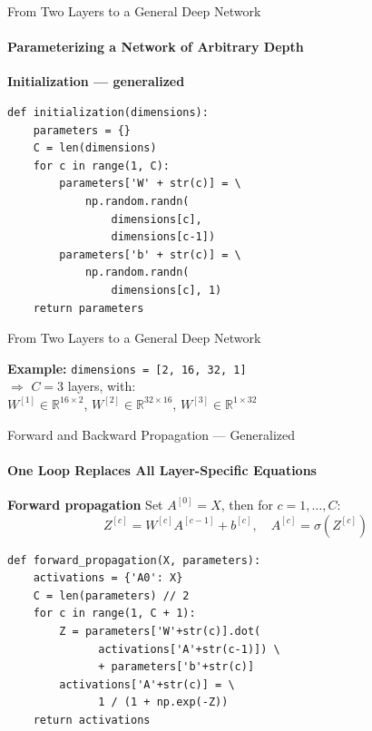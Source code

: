\documentclass[aspectratio=169]{beamer}
\begin{document}
\begin{frame}[fragile]{From Two Layers to a General Deep Network}
\framesubtitle{Parameterizing a Network of Arbitrary Depth}

\textbf{Initialization --- generalized}
\begin{lstlisting}
def initialization(dimensions):
    parameters = {}
    C = len(dimensions)
    for c in range(1, C):
        parameters['W' + str(c)] = \
            np.random.randn(
                dimensions[c], 
                dimensions[c-1])
        parameters['b' + str(c)] = \
            np.random.randn(
                dimensions[c], 1)
    return parameters
\end{lstlisting}
\end{frame}
%
%
\begin{frame}[fragile]{From Two Layers to a General Deep Network}
\colorbox{blue!8}{\parbox{0.92\linewidth}{\normalsize
\textbf{Example:} \texttt{dimensions = [2, 16, 32, 1]}\\[1pt]
$\Rightarrow$ $C=3$ layers, with:\\
\quad $W^{[1]} \in \mathbb{R}^{16\times 2}$, \;
$W^{[2]} \in \mathbb{R}^{32\times 16}$, \;
$W^{[3]} \in \mathbb{R}^{1\times 32}$}}

\end{frame}
%
%
\begin{frame}[fragile]{Forward and Backward Propagation --- Generalized}
\framesubtitle{One Loop Replaces All Layer-Specific Equations}

\textbf{\small Forward propagation}
{\small Set $A^{[0]} = X$, then for $c = 1, \dots, C$:}
{\small\color{layer1violet}
\[
\boxed{Z^{[c]} = W^{[c]} A^{[c-1]} + b^{[c]}, \quad A^{[c]} = \sigma(Z^{[c]})}
\]
}
\small
\begin{lstlisting}
def forward_propagation(X, parameters):
    activations = {'A0': X}
    C = len(parameters) // 2
    for c in range(1, C + 1):
        Z = parameters['W'+str(c)].dot(
              activations['A'+str(c-1)]) \
              + parameters['b'+str(c)]
        activations['A'+str(c)] = \
              1 / (1 + np.exp(-Z))
    return activations
\end{lstlisting}


\end{frame}
\end{document}
